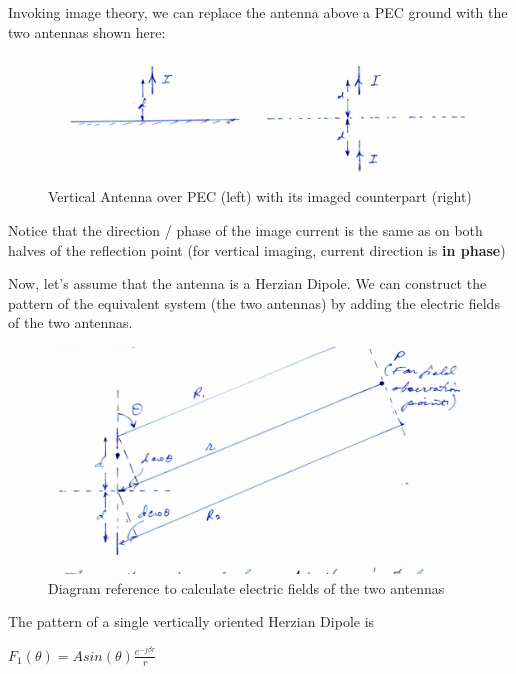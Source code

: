 \documentclass{article}
\begin{document}
Invoking image theory, we can replace the antenna above a PEC ground with the two antennas shown here: 

\begin{figure}[H]
  \centering
     \includegraphics[scale=0.4]{Course Notes/images/9.1.png}
  \caption{Vertical Antenna over PEC (left) with its imaged counterpart (right)}
\end{figure}

Notice that the direction / phase of the image current is the same as on both halves of the reflection point (for vertical imaging, current direction is \textbf{in phase})

Now, let's assume that the antenna is a Herzian Dipole. We can construct the pattern of the equivalent system (the two antennas) by adding the electric fields of the two antennas.

\begin{figure}[H]
  \centering
     \includegraphics[scale=0.4]{Course Notes/images/9.2.png}
  \caption{Diagram reference to calculate electric fields of the two antennas}
\end{figure}

The pattern of a single vertically oriented Herzian Dipole is

\begin{center}
    $F_1(\theta) = A sin(\theta) \frac{e^{-j \beta r}}{r}$
\end{center}
\end{document}
